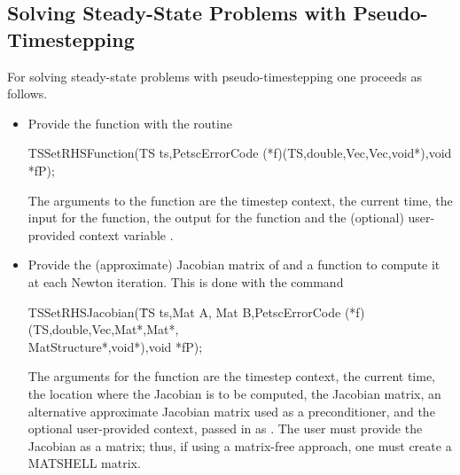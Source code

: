 \subsection{Solving Steady-State Problems with Pseudo-Timestepping}

For solving steady-state problems with pseudo-timestepping one proceeds 
as follows.
\begin{itemize}
\item Provide the function  with the routine
\begin{tabbing}
 TSSetRHSFunction(TS ts,PetscErrorCode (*f)(TS,double,Vec,Vec,void*),void *fP);
\end{tabbing}
The  arguments to the function  are
the timestep context, the current time, the input for the function,
the output for the function and the (optional) user-provided context
variable .

\item Provide the (approximate) Jacobian matrix of  and a 
function to compute it at each Newton iteration. This is done with the command
\begin{tabbing}
 TSSetRHSJacobian(\=TS ts,Mat A, Mat B,PetscErrorCode (*f)(TS,double,Vec,Mat*,Mat*,\\
                  \>        MatStructure*,void*),void *fP);
\end{tabbing}
The  arguments for the function  are
the timestep context, the current time, the location where the
Jacobian is to be computed, the Jacobian matrix, an alternative
approximate Jacobian matrix used as a preconditioner, and the optional
user-provided context, passed in as . The user must provide the 
Jacobian as a matrix; thus, if using a matrix-free approach, one 
must create a MATSHELL matrix.
\end{itemize}

